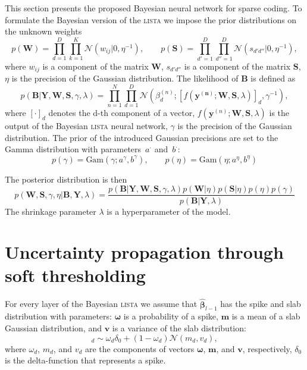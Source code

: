 \documentclass{article}
\begin{document}
This section presents the proposed Bayesian neural network for sparse coding. To formulate the Bayesian version of the \textsc{lista} we impose the prior distributions on the unknown weights
\begin{equation}
\label{eq:ws}
p(\mathbf{W}) = \prod_{d=1}^D\prod_{k=1}^K \mathcal{N}(w_{ij} | 0, \eta^{-1}), \qquad
p(\mathbf{S}) = \prod_{d'=1}^D\prod_{d''=1}^D \mathcal{N}(s_{d'd''} | 0, \eta^{-1}),
\end{equation}
where $w_{ij}$ is a component of the matrix $\mathbf{W}$, $s_{d'd''}$ is a component of the matrix $\mathbf{S}$, $\eta$ is the precision of the Gaussian distribution.
The likelihood of $\mathbf{B}$ is defined as
\begin{equation}
\label{eq:likelihood}
p(\mathbf{B}| \mathbf{Y}, \mathbf{W}, \mathbf{S}, \gamma, \lambda) = \prod_{n=1}^N\prod_{d=1}^D\mathcal{N}(\beta_d^{(n)}; [f(\mathbf{y^{(n)}}; \mathbf{W}, \mathbf{S}, \lambda)]_d, \gamma^{-1}),
\end{equation}
where $[\cdot]_d$ denotes the d-th component of a vector, $f(\mathbf{y}^{(n)}; \mathbf{W}, \mathbf{S}, \lambda)$ is the output of the Bayesian \textsc{lista} neural network, $\gamma$ is the precision of the Gaussian distribution.
The prior of the introduced Gaussian precisions are set to the Gamma distribution with parameters~$a^{\cdot}$ and~$b^{\cdot}$:
\begin{equation}
\label{eq:gamma_eta}
p(\gamma) = \text{Gam}\left(\gamma; a^{\gamma}, b^{\gamma}\right), \qquad
p(\eta) = \text{Gam}\left(\eta; 	a^{\eta}, b^{\eta}\right)
\end{equation}

The posterior distribution is then
\begin{equation}
\label{eq:posterior}
p(\mathbf{W}, \mathbf{S}, \gamma, \eta | \mathbf{B}, \mathbf{Y}, \lambda) = \frac{p(\mathbf{B} | \mathbf{Y}, \mathbf{W},  \mathbf{S}, \gamma, \lambda) p(\mathbf{W} | \eta )p(\mathbf{S} | \eta) p(\eta) p(\gamma)}{p(\mathbf{B} | \mathbf{Y}, \lambda)}
\end{equation}
The shrinkage parameter $\lambda$ is a hyperparameter of the model.

\section{Uncertainty propagation through soft thresholding}
\label{sec:fprop}
For every layer of the Bayesian \textsc{lista} we assume that $\widehat{\boldsymbol\beta}_{l-1}$ has the spike and slab distribution with parameters: $\boldsymbol\omega$ is a probability of a spike, $\mathbf{m}$ is a mean of a slab Gaussian distribution, and $\mathbf{v}$ is a variance of the slab distribution:
\begin{equation}
[\widehat{\boldsymbol\beta}_{l-1}]_d \sim \omega_d \delta_0 + (1 - \omega_d)\mathcal{N}(m_d, v_d),
\end{equation}
where $\omega_d$, $m_d$, and $v_d$ are the components of vectors $\boldsymbol\omega$, $\mathbf{m}$, and $\mathbf{v}$, respectively, $\delta_0$ is the delta-function that represents a spike.
\end{document}
